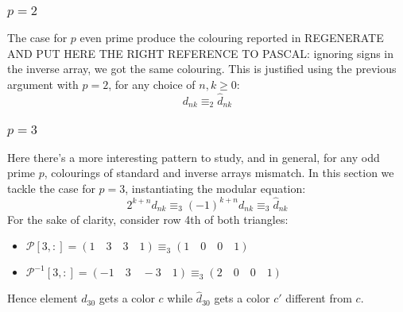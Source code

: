 \documentclass[11pt,a4paper]{article} %
\begin{document}
    \subsubsection{$p=2$}
    The case for $p$ even prime produce the colouring reported in
    REGENERATE AND PUT HERE THE RIGHT REFERENCE TO PASCAL: ignoring
    signs in the inverse array, we got the same colouring.  This is
    justified using the previous argument with $p=2$, for any choice
    of $n, k \geq 0$:
    \begin{displaymath} 
        d_{nk} \equiv_{2} \hat{d}_{nk} 
    \end{displaymath} 

    \subsubsection{$p=3$}
    Here there's a more interesting pattern to study, and in general,
    for any odd prime $p$, colourings of standard and inverse arrays
    mismatch. In this section we tackle the case for $p=3$,
    instantiating the modular equation:
    \begin{displaymath}
      2^{k+n}d_{nk}\equiv_{3}(-1)^{k+n}d_{nk} \equiv_{3} \hat{d}_{nk}
    \end{displaymath}
    For the sake of clarity, consider row 4th of both triangles:
    \begin{itemize}
    \item $\mathcal{P}[3,:] = (1 \quad 3 \quad 3 \quad 1) \equiv_{3}(1 \quad 0 \quad 0 \quad 1)$
    \item $\mathcal{P}^{-1}[3,:] = (-1 \quad 3 \quad -3 \quad 1) \equiv_{3}(2 \quad 0 \quad 0 \quad 1)$
    \end{itemize}
    Hence element $d_{30}$ gets a color $c$ while $\hat{d}_{30}$ gets
    a color $c'$ different from $c$.
\end{document}
